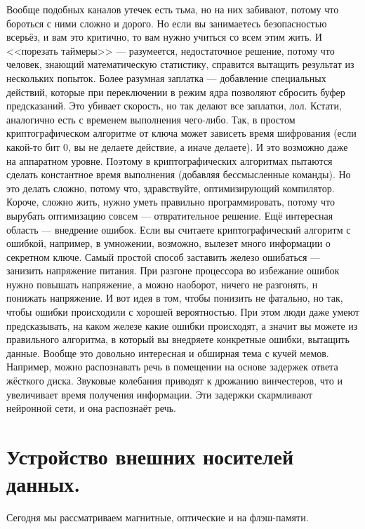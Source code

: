 \documentclass{article}
\begin{document}
    Вообще подобных каналов утечек есть тьма, но на них забивают, потому что бороться с ними сложно и дорого. Но если вы занимаетесь безопасностью всерьёз, и вам это критично, то вам нужно учиться со всем этим жить. И <<порезать таймеры>> --- разумеется, недостаточное решение, потому что человек, знающий математическую статистику, справится вытащить результат из нескольких попыток. Более разумная заплатка --- добавление специальных действий, которые при переключении в режим ядра позволяют сбросить буфер предсказаний. Это убивает скорость, но так делают все заплатки, лол. Кстати, аналогично есть с временем выполнения чего-либо. Так, в простом криптографическом алгоритме от ключа может зависеть время шифрования (если какой-то бит 0, вы не делаете действие, а иначе делаете). И это возможно даже на аппаратном уровне. Поэтому в криптографических алгоритмах пытаются сделать константное время выполнения (добавляя бессмысленные команды). Но это делать сложно, потому что, здравствуйте, оптимизирующий компилятор. Короче, сложно жить, нужно уметь правильно программировать, потому что вырубать оптимизацию совсем --- отвратительное решение. Ещё интересная область --- внедрение ошибок. Если вы считаете криптографический алгоритм с ошибкой, например, в умножении, возможно, вылезет много информации о секретном ключе. Самый простой способ заставить железо ошибаться --- занизить напряжение питания. При разгоне процессора во избежание ошибок нужно повышать напряжение, а можно наоборот, ничего не разгонять, н понижать напряжение. И вот идея в том, чтобы понизить не фатально, но так, чтобы ошибки происходили с хорошей вероятностью. При этом люди даже умеют предсказывать, на каком железе какие ошибки происходят, а значит вы можете из правильного алгоритма, в который вы внедряете конкретные ошибки, вытащить данные. Вообще это довольно интересная и обширная тема с кучей мемов. Например, можно распознавать речь в помещении на основе задержек ответа жёсткого диска. Звуковые колебания приводят к дрожанию винчестеров, что и увеличивает время получения информации. Эти задержки скармливают нейронной сети, и она распознаёт речь.
    \section{Устройство внешних носителей данных.}
    Сегодня мы рассматриваем магнитные, оптические и на флэш-памяти.
\end{document}
